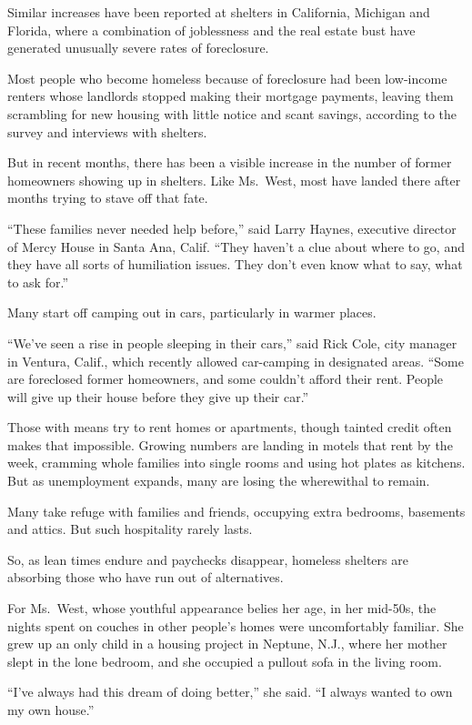 ﻿\documentclass[12pt]{article}
\begin{document}
Similar increases have been reported at shelters in California, Michigan and Florida, where a
combination of joblessness and the real estate bust have generated unusually severe rates of
foreclosure.

Most people who become homeless because of foreclosure had been low-income renters whose landlords
stopped making their mortgage payments, leaving them scrambling for new housing with little notice
and scant savings, according to the survey and interviews with shelters.

But in recent months, there has been a visible increase in the number of former homeowners showing
up in shelters. Like Ms.~West, most have landed there after months trying to stave off that fate.

``These families never needed help before,'' said Larry Haynes, executive director of Mercy House in
Santa Ana, Calif. ``They haven't a clue about where to go, and they have all sorts of humiliation
issues. They don't even know what to say, what to ask for.''

Many start off camping out in cars, particularly in warmer places.

``We've seen a rise in people sleeping in their cars,'' said Rick Cole, city manager in Ventura,
Calif., which recently allowed car-camping in designated areas. ``Some are foreclosed former
homeowners, and some couldn't afford their rent. People will give up their house before they give up
their car.''

Those with means try to rent homes or apartments, though tainted credit often makes that impossible.
Growing numbers are landing in motels that rent by the week, cramming whole families into single
rooms and using hot plates as kitchens. But as unemployment expands, many are losing the wherewithal
to remain.

Many take refuge with families and friends, occupying extra bedrooms, basements and attics. But such
hospitality rarely lasts.

So, as lean times endure and paychecks disappear, homeless shelters are absorbing those who have run
out of alternatives.

For Ms.~West, whose youthful appearance belies her age, in her mid-50s, the nights spent on couches
in other people's homes were uncomfortably familiar. She grew up an only child in a housing project
in Neptune, N.J., where her mother slept in the lone bedroom, and she occupied a pullout sofa in the
living room.

``I've always had this dream of doing better,'' she said. ``I always wanted to own my own house.''
\end{document}
